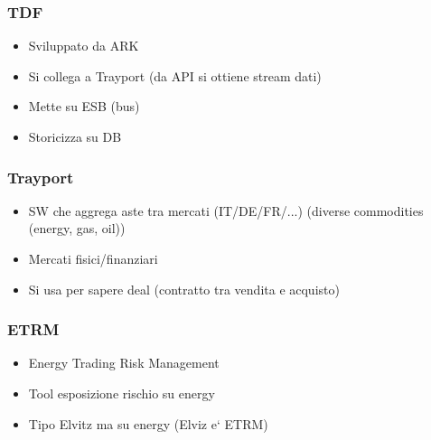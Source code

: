\subsubsection{TDF}
    \begin{itemize}
        \item Sviluppato da ARK
        \item Si collega a Trayport (da API si ottiene stream dati)
        \item Mette su ESB (bus)
        \item Storicizza su DB
    \end{itemize}
\subsubsection{Trayport}
    \begin{itemize}
        \item SW che aggrega aste tra mercati (IT/DE/FR/...) (diverse commodities (energy, gas, oil))
        \item Mercati fisici/finanziari
        \item Si usa per sapere deal (contratto tra vendita e acquisto)
    \end{itemize}
\subsubsection{ETRM}
    \begin{itemize}
        \item Energy Trading Risk Management
        \item Tool esposizione rischio su energy
        \item Tipo Elvitz ma su energy (Elviz e` ETRM)
    \end{itemize}

